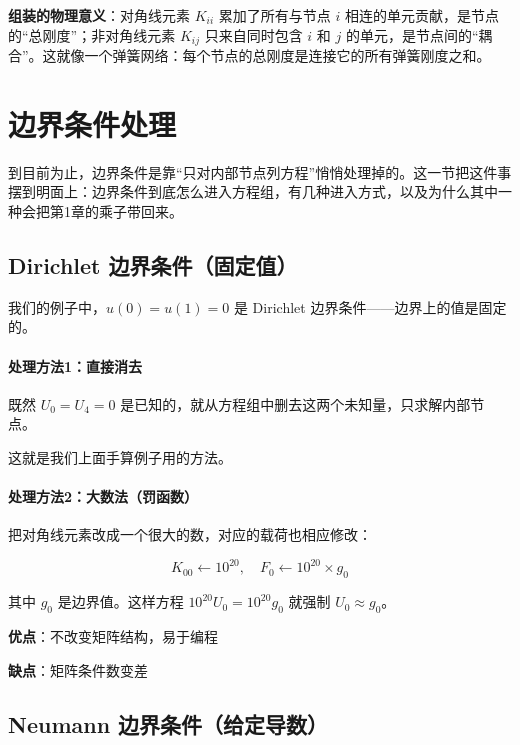 \begin{physicalmeaning}
\textbf{组装的物理意义}：对角线元素 $K_{ii}$ 累加了所有与节点 $i$ 相连的单元贡献，是节点的“总刚度”；非对角线元素 $K_{ij}$ 只来自同时包含 $i$ 和 $j$ 的单元，是节点间的“耦合”。这就像一个弹簧网络：每个节点的总刚度是连接它的所有弹簧刚度之和。
\end{physicalmeaning}

\section{边界条件处理}

到目前为止，边界条件是靠“只对内部节点列方程”悄悄处理掉的。这一节把这件事摆到明面上：边界条件到底怎么进入方程组，有几种进入方式，以及为什么其中一种会把第1章的乘子带回来。

\subsection{Dirichlet 边界条件（固定值）}

我们的例子中，$u(0) = u(1) = 0$ 是 Dirichlet 边界条件——边界上的值是固定的。

\paragraph{处理方法1：直接消去}

既然 $U_0 = U_4 = 0$ 是已知的，就从方程组中删去这两个未知量，只求解内部节点。

这就是我们上面手算例子用的方法。

\paragraph{处理方法2：大数法（罚函数）}

把对角线元素改成一个很大的数，对应的载荷也相应修改：

\[
K_{00} \leftarrow 10^{20}, \quad F_0 \leftarrow 10^{20} \times g_0
\]

其中 $g_0$ 是边界值。这样方程 $10^{20} U_0 = 10^{20} g_0$ 就强制 $U_0 \approx g_0$。

\textbf{优点}：不改变矩阵结构，易于编程

\textbf{缺点}：矩阵条件数变差

\subsection{Neumann 边界条件（给定导数）}

